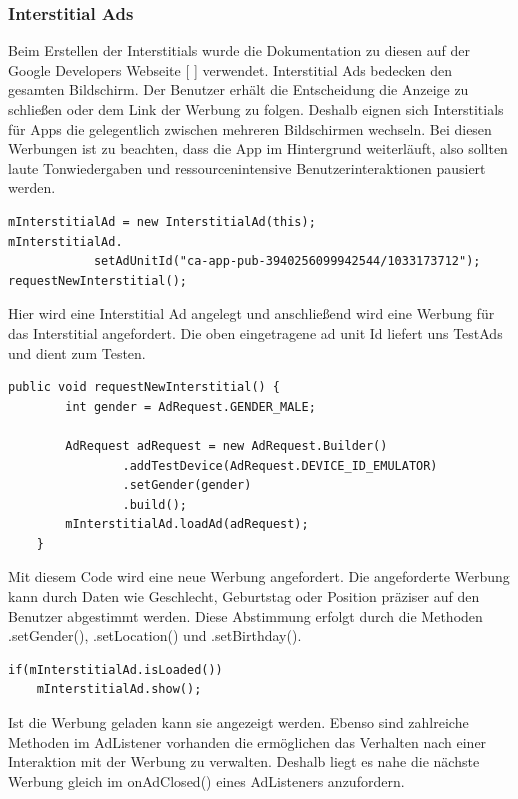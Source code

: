 \documentclass[FIPLY_base.tex]{subfiles}
\begin{document}
\subsubsection{Interstitial Ads}
Beim Erstellen der Interstitials wurde die Dokumentation zu diesen auf der Google Developers Webseite [ \cite{gdInterstitials}] verwendet. \newline 
Interstitial Ads bedecken den gesamten Bildschirm. Der Benutzer erhält die Entscheidung die Anzeige zu schließen oder dem Link der Werbung zu folgen. Deshalb eignen sich Interstitials für Apps die gelegentlich zwischen mehreren Bildschirmen wechseln.
Bei diesen Werbungen ist zu beachten, dass die App im Hintergrund weiterläuft, also sollten laute Tonwiedergaben und ressourcenintensive Benutzerinteraktionen pausiert werden.
\ \\
\begin{lstlisting}
mInterstitialAd = new InterstitialAd(this);
mInterstitialAd.
       		setAdUnitId("ca-app-pub-3940256099942544/1033173712");
requestNewInterstitial();
\end{lstlisting}
Hier wird eine Interstitial Ad angelegt und anschließend wird eine Werbung für das Interstitial angefordert. 
Die oben eingetragene ad unit Id liefert uns TestAds und dient zum Testen.
\ \\
\begin{lstlisting}
public void requestNewInterstitial() {
        int gender = AdRequest.GENDER_MALE;
        
        AdRequest adRequest = new AdRequest.Builder()
                .addTestDevice(AdRequest.DEVICE_ID_EMULATOR)
                .setGender(gender)
                .build();
        mInterstitialAd.loadAd(adRequest);
    }
\end{lstlisting}
Mit diesem Code wird eine neue Werbung angefordert. Die angeforderte Werbung kann durch Daten wie Geschlecht, Geburtstag oder Position präziser auf den Benutzer abgestimmt werden.
Diese Abstimmung erfolgt durch die Methoden .setGender(), .setLocation() und .setBirthday().	
\ \\
\begin{lstlisting}
if(mInterstitialAd.isLoaded()) 
    mInterstitialAd.show();
\end{lstlisting}
Ist die Werbung geladen kann sie angezeigt werden.\newline
Ebenso sind zahlreiche Methoden im AdListener vorhanden die ermöglichen das Verhalten nach einer Interaktion mit der Werbung zu verwalten.\newline
Deshalb liegt es nahe die nächste Werbung gleich im onAdClosed() eines AdListeners anzufordern.
\end{document}

